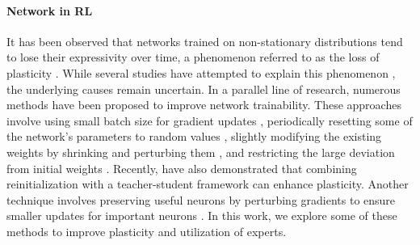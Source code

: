 \paragraph{Network  in RL} It has been observed that networks trained on non-stationary distributions tend to lose their expressivity over time, a phenomenon referred to as the loss of plasticity \citep{kumar2020implicit, lyle2021understanding}. While several studies have attempted to explain this phenomenon \citep{lyle2023understanding, ma2023revisiting, lyle2024disentangling}, the underlying causes remain uncertain. In a parallel line of research, numerous methods have been proposed to improve network trainability. These approaches involve using small batch size for gradient updates \citep{ceron2023small}, periodically resetting some of the network's parameters to random values \citep{sokar2023dormant, nikishin2022primacy,igl2020transient,dohare2024loss}, slightly modifying the existing weights by shrinking and perturbing them \citep{d'oro2022sampleefficient,schwarzer23bbf}, and restricting the large deviation from initial weights \citep{kumar2023maintaining,lewandowski2024d}. Recently,  have also demonstrated that combining reinitialization with a teacher-student framework can enhance plasticity. Another technique involves preserving useful neurons by perturbing gradients to ensure smaller updates for important neurons . In this work, we explore some of these methods to improve plasticity and utilization of experts.



